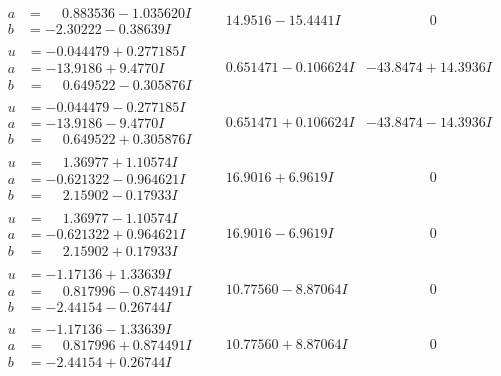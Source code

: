 \documentclass[1p]{elsarticle_modified}
\theoremstyle{definition}
\begin{document}
$$\begin{array}{c|c|c}
\begin{aligned}
a &= \phantom{-}0.883536 - 1.035620 I \\
b &= -2.30222 - 0.38639 I\end{aligned}
 & \phantom{-}14.9516 - 15.4441 I & \phantom{-0.000000 } 0 \\ \hline\begin{aligned}
u &= -0.044479 + 0.277185 I \\
a &= -13.9186 + 9.4770 I \\
b &= \phantom{-}0.649522 - 0.305876 I\end{aligned}
 & \phantom{-}0.651471 - 0.106624 I & -43.8474 + 14.3936 I \\ \hline\begin{aligned}
u &= -0.044479 - 0.277185 I \\
a &= -13.9186 - 9.4770 I \\
b &= \phantom{-}0.649522 + 0.305876 I\end{aligned}
 & \phantom{-}0.651471 + 0.106624 I & -43.8474 - 14.3936 I \\ \hline\begin{aligned}
u &= \phantom{-}1.36977 + 1.10574 I \\
a &= -0.621322 - 0.964621 I \\
b &= \phantom{-}2.15902 - 0.17933 I\end{aligned}
 & \phantom{-}16.9016 + 6.9619 I & \phantom{-0.000000 } 0 \\ \hline\begin{aligned}
u &= \phantom{-}1.36977 - 1.10574 I \\
a &= -0.621322 + 0.964621 I \\
b &= \phantom{-}2.15902 + 0.17933 I\end{aligned}
 & \phantom{-}16.9016 - 6.9619 I & \phantom{-0.000000 } 0 \\ \hline\begin{aligned}
u &= -1.17136 + 1.33639 I \\
a &= \phantom{-}0.817996 - 0.874491 I \\
b &= -2.44154 - 0.26744 I\end{aligned}
 & \phantom{-}10.77560 - 8.87064 I & \phantom{-0.000000 } 0 \\ \hline\begin{aligned}
u &= -1.17136 - 1.33639 I \\
a &= \phantom{-}0.817996 + 0.874491 I \\
b &= -2.44154 + 0.26744 I\end{aligned}
 & \phantom{-}10.77560 + 8.87064 I & \phantom{-0.000000 } 0 \\ \hline\begin{aligned}

\end{aligned}
\end{array}$$
\end{document}
